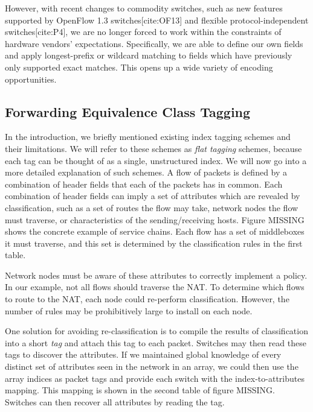   However, with recent changes to commodity switches, such as new features supported by OpenFlow 1.3 switches[cite:OF13] and flexible protocol-independent switches[cite:P4], we are no longer forced to work within the constraints of hardware vendors' expectations. Specifically, we are able to define our own fields and apply longest-prefix or wildcard matching to fields which have previously only supported exact matches. This opens up a wide variety of encoding opportunities.

\subsection{Forwarding Equivalence Class Tagging}
  
In the introduction, we briefly mentioned existing index tagging schemes and their limitations. We will refer to these schemes as \textit{flat tagging} schemes, because each tag can be thought of as a single, unstructured index.  We will now go into a more detailed explanation of such schemes. A flow of packets is defined by a combination of header fields that each of the packets has in common. Each combination of header fields can imply a set of attributes which are revealed by classification, such as a set of routes the flow may take, network nodes the flow must traverse, or characteristics of the sending/receiving hosts. 
Figure MISSING shows the concrete example of service chains. Each flow has a set of middleboxes it must traverse, and this set is determined by the classification rules in the first table.

Network nodes must be aware of these attributes to correctly implement a policy. In our example, not all flows should traverse the NAT. To determine which flows to route to the NAT, each node could re-perform classification. However, the number of rules may be prohibitively large to install on each node. 

One solution for avoiding re-classification is to compile the results of classification into a short \textit{tag} and attach this tag to each packet. Switches may then read these tags to discover the attributes. If we maintained global knowledge of every distinct set of attributes seen in the network in an array, we could then use the array indices as packet tags and provide each switch with the index-to-attributes mapping. This mapping is shown in the second table of figure MISSING. Switches can then recover all attributes by reading the tag. 


